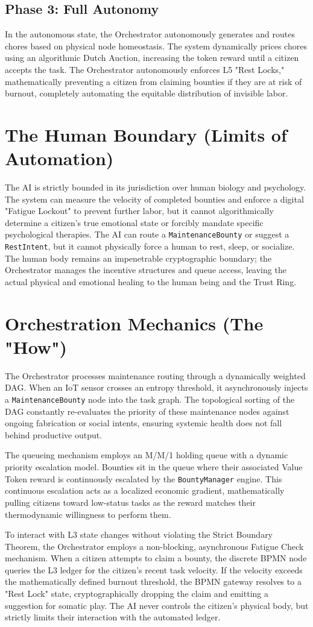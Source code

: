 \subsection{Phase 3: Full Autonomy}
In the autonomous state, the Orchestrator autonomously generates and routes chores based on physical node homeostasis. The system dynamically prices chores using an algorithmic Dutch Auction, increasing the token reward until a citizen accepts the task. The Orchestrator autonomously enforces L5 "Rest Locks," mathematically preventing a citizen from claiming bounties if they are at risk of burnout, completely automating the equitable distribution of invisible labor.

\section{The Human Boundary (Limits of Automation)}
The AI is strictly bounded in its jurisdiction over human biology and psychology. The system can measure the velocity of completed bounties and enforce a digital "Fatigue Lockout" to prevent further labor, but it cannot algorithmically determine a citizen's true emotional state or forcibly mandate specific psychological therapies. The AI can route a \texttt{MaintenanceBounty} or suggest a \texttt{RestIntent}, but it cannot physically force a human to rest, sleep, or socialize. The human body remains an impenetrable cryptographic boundary; the Orchestrator manages the incentive structures and queue access, leaving the actual physical and emotional healing to the human being and the Trust Ring.

\section{Orchestration Mechanics (The "How")}
The Orchestrator processes maintenance routing through a dynamically weighted DAG. When an IoT sensor crosses an entropy threshold, it asynchronously injects a \texttt{MaintenanceBounty} node into the task graph. The topological sorting of the DAG constantly re-evaluates the priority of these maintenance nodes against ongoing fabrication or social intents, ensuring systemic health does not fall behind productive output.

The queueing mechanism employs an M/M/1 holding queue with a dynamic priority escalation model. Bounties sit in the queue where their associated Value Token reward is continuously escalated by the \texttt{BountyManager} engine. This continuous escalation acts as a localized economic gradient, mathematically pulling citizens toward low-status tasks as the reward matches their thermodynamic willingness to perform them.

To interact with L3 state changes without violating the Strict Boundary Theorem, the Orchestrator employs a non-blocking, asynchronous Fatigue Check mechanism. When a citizen attempts to claim a bounty, the discrete BPMN node queries the L3 ledger for the citizen's recent task velocity. If the velocity exceeds the mathematically defined burnout threshold, the BPMN gateway resolves to a "Rest Lock" state, cryptographically dropping the claim and emitting a suggestion for somatic play. The AI never controls the citizen's physical body, but strictly limits their interaction with the automated ledger.
